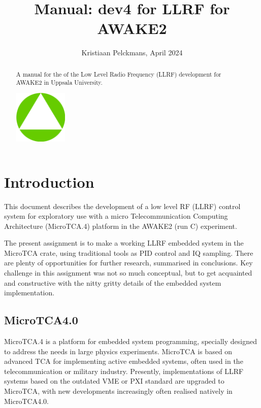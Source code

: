 \documentclass[12pt]{amsart}
\title{Manual: dev4 for LLRF for AWAKE2}
\author{Kristiaan Pelckmans, April 2024}
\date{} %
\begin{document}
\maketitle

\begin{abstract}
A manual for the  of the Low Level Radio Frequency (LLRF) development for AWAKE2 in Uppsala University.

\vspace{+25mm}


\centering\includegraphics[width=1in]{im/dev4.png} 


\vspace{+25mm}



\end{abstract}

\newpage
\tableofcontents
\newpage

\section{Introduction}

This document describes the development of a low level RF (LLRF) control system
for exploratory use with a micro Telecommunication Computing Architecture (MicroTCA.4) platform
in the AWAKE2 (run C) experiment.

The present assignment is to make a working LLRF  embedded system in the MicroTCA crate, using traditional tools as PID control and IQ sampling.
There are plenty of opportunities for further research, summarised in conclusions.
Key challenge in this assignment was not so much conceptual,
but to get acquainted and constructive with the nitty gritty details of the embedded system implementation.

\subsection{MicroTCA4.0}

MicroTCA.4 is a platform for embedded system programming, specially designed to address the needs in large physics experiments.
MicroTCA is based on advanced TCA for implementing active embedded systems, often used in the telecommunication or military industry.
Presently, implementations of LLRF systems based on the outdated VME or PXI standard  are upgraded to MicroTCA,
with new developments increasingly often realised natively in MicroTCA4.0.
\end{document}
